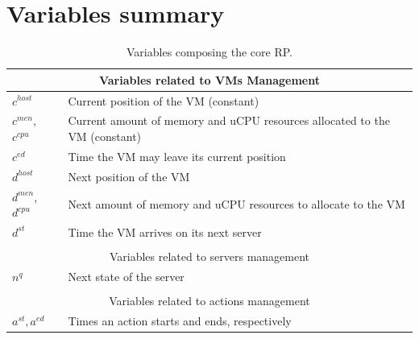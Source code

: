 \section{Variables summary}
\begin{table}[htdp]
\centering
\begin{tabular}{lp{8cm}}
\multicolumn{2}{c}{Variables related to VMs Management} \\\hline
$c^{host}$ & Current position of the VM (constant)\\
$c^{men}$, $c^{cpu}$  & Current amount of memory and uCPU resources allocated to the VM (constant)\\
$c^{ed}$ & Time the VM may leave its current position\\
$d^{host}$ & Next position of the VM \\
$d^{men}$, $d^{cpu}$  & Next amount of memory and uCPU resources to allocate to the VM \\
$d^{st}$ & Time the VM arrives on its next server\\

\\\multicolumn{2}{c}{Variables related to servers management} \\\hline
$n^{q}$ & Next state of the server\\

\\\multicolumn{2}{c}{Variables related to actions management} \\\hline
$a^{st}, a^{ed}$ & Times an action starts and ends, respectively  \\

\end{tabular}
\caption{Variables composing the core RP.}\label{tab: variables}
\end{table}
